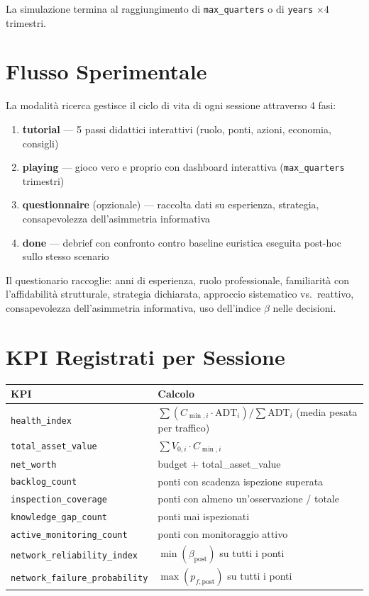 \documentclass[11pt,a4paper]{article}
\begin{document}
La simulazione termina al raggiungimento di \texttt{max\_quarters} o di \texttt{years} $\times 4$ trimestri.

\section{Flusso Sperimentale}

La modalit\`a ricerca gestisce il ciclo di vita di ogni sessione attraverso 4 fasi:

\begin{enumerate}
  \item \textbf{tutorial} --- 5 passi didattici interattivi (ruolo, ponti, azioni, economia, consigli)
  \item \textbf{playing} --- gioco vero e proprio con dashboard interattiva (\texttt{max\_quarters} trimestri)
  \item \textbf{questionnaire} (opzionale) --- raccolta dati su esperienza, strategia, consapevolezza dell'asimmetria informativa
  \item \textbf{done} --- debrief con confronto contro baseline euristica eseguita post-hoc sullo stesso scenario
\end{enumerate}

Il questionario raccoglie: anni di esperienza, ruolo professionale, familiarit\`a con l'affidabilit\`a strutturale, strategia dichiarata, approccio sistematico vs.\ reattivo, consapevolezza dell'asimmetria informativa, uso dell'indice $\beta$ nelle decisioni.

\section{KPI Registrati per Sessione}

\begin{center}
\begin{tabular}{lp{9cm}}
\toprule
\textbf{KPI} & \textbf{Calcolo} \\
\midrule
\texttt{health\_index} & $\sum(C_{\min,i} \cdot \text{ADT}_i) / \sum \text{ADT}_i$ (media pesata per traffico) \\
\texttt{total\_asset\_value} & $\sum V_{0,i} \cdot C_{\min,i}$ \\
\texttt{net\_worth} & budget $+$ total\_asset\_value \\
\texttt{backlog\_count} & ponti con scadenza ispezione superata \\
\texttt{inspection\_coverage} & ponti con almeno un'osservazione / totale \\
\texttt{knowledge\_gap\_count} & ponti mai ispezionati \\
\texttt{active\_monitoring\_count} & ponti con monitoraggio attivo \\
\texttt{network\_reliability\_index} & $\min(\beta_{\text{post}})$ su tutti i ponti \\
\texttt{network\_failure\_probability} & $\max(p_{f,\text{post}})$ su tutti i ponti \\
\bottomrule
\end{tabular}
\end{center}
\end{document}
